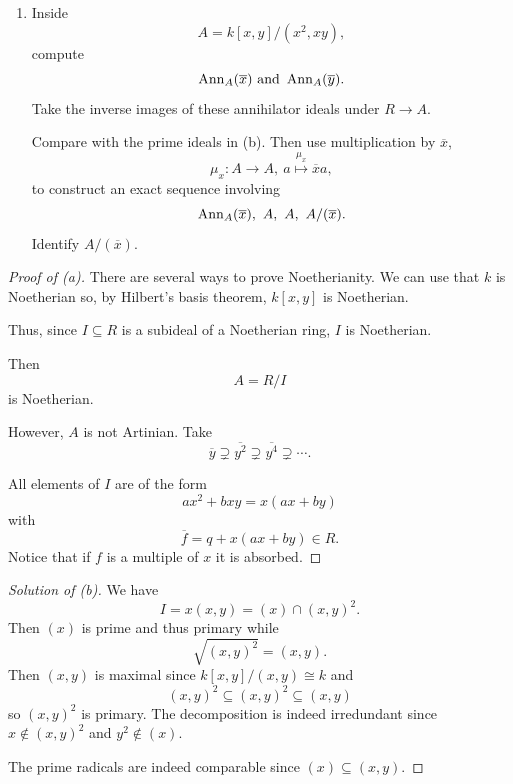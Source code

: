 \documentclass[11pt]{article}
\begin{document}
\begin{prob}
\begin{enumerate}[label=(\alph*)]
            Then identify each of 
            \[
                R/Q_1, \ R/Q_2, \ R/(Q_1+Q_2) 
            \]
            with familiar $k$-algebras and 
            rewrite the sequence using those 
            identifications. 
        \item Inside 
            \[
                A = k[x,y]/(x^2,xy), 
            \]
            compute 
            \[
                \operatorname{Ann}_A(\overline x) 
                \ \text{and} \ \operatorname{Ann}_A(\overline y). 
            \]
            Take the inverse images of these 
            annihilator ideals under 
            $R \to A$. 

            Compare with the prime ideals in (b). 
            Then use multiplication by $\overline x$, 
            \[
                \mu_x : A \to A, 
                \ a \overset{\mu_x}\mapsto \overline xa, 
            \]
            to construct an exact sequence involving 
            \[
                \operatorname{Ann}_A(\overline x), \ A, \ A, \ A/(\overline x).
            \]
            Identify $A/(\overline x)$. 
    \end{enumerate}
\end{prob}
\begin{proof}[Proof of (a)]
    There are several ways to prove 
    Noetherianity. 
    We can use that 
    $k$ is Noetherian so, by 
    Hilbert's basis theorem, 
    $k[x,y]$ is Noetherian. 

    Thus, since $I \subseteq R$ is a 
    subideal of a Noetherian ring, 
    $I$ is Noetherian. 

    Then 
    \[
        A = R/I 
    \]
    is Noetherian. 

    However, $A$ is not Artinian. 
    Take 
    \[
        \overline y 
        \supsetneq \overline{y^2} \supsetneq 
        \overline{y^4} \supsetneq \cdots. 
    \]

    All elements of $I$ are of the form 
    \[
        ax^2 + bxy = x(ax+by)
    \]
    with
    \[
        \overline f = q + x(ax+by) \in R. 
    \]
    Notice that if $f$ is a multiple of $x$ it 
    is absorbed. 
\end{proof}
\begin{proof}[Solution of (b)]
    We have 
    \[
        I = x(x,y) = (x) \cap (x,y)^2. 
    \]
    Then $(x)$ is prime and thus primary while 
    \[
        \sqrt{(x,y)^2} = (x,y). 
    \]
    Then $(x,y)$ is maximal since $k[x,y]/(x,y) \cong k$ 
    and 
    \[
        (x,y)^2 \subseteq (x,y)^2 \subseteq (x,y) 
    \]
    so $(x,y)^2$ is primary. 
    The decomposition is indeed irredundant since 
    $x \not\in (x,y)^2$ and $y^2\not\in (x)$.

    The prime radicals are indeed comparable since 
    $(x) \subseteq (x,y)$. 
\end{proof}
\end{document}
